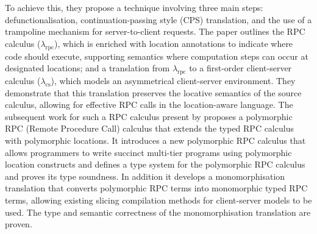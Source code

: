To achieve this, they propose a technique involving three main steps: defunctionalisation, continuation-passing style (CPS) translation, and the use of a trampoline mechanism for server-to-client requests. The paper outlines the RPC calculus ($\lambda_{\text{rpc}}$), which is enriched with location annotations to indicate where code should execute, supporting semantics where computation steps can occur at designated locations; and a translation from $\lambda_{\text{rpc}}$ to a first-order client-server calculus ($\lambda_{\text{cs}}$), which models an asymmetrical client-server environment. They demonstrate that this translation preserves the locative semantics of the source calculus, allowing for effective RPC calls in the location-aware language. The subsequent work for such a RPC calculus present by \citep{choi2020polymorphic} proposes a polymorphic RPC (Remote Procedure Call) calculus that extends the typed RPC calculus with polymorphic locations. It introduces a new polymorphic RPC calculus that allows programmers to write succinct multi-tier programs using polymorphic location constructs and defines a type system for the polymorphic RPC calculus and proves its type soundness. In addition it develops a monomorphisation translation that converts polymorphic RPC terms into monomorphic typed RPC terms, allowing existing slicing compilation methods for client-server models to be used. The type and semantic correctness of the monomorphisation translation are proven.

